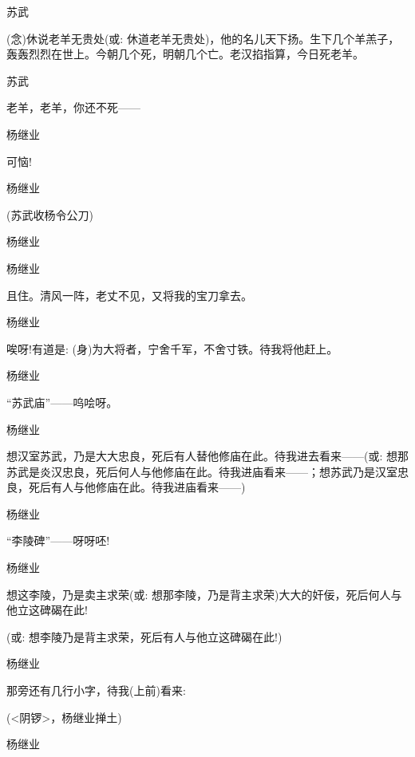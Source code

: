 {{苏武

({\akai 念})休说老羊无贵处({\akai 或}: 休道老羊无贵处)，他的名儿天下扬。生下几个羊羔子，轰轰烈烈在世上。今朝几个死，明朝几个亡。老汉掐指算，今日死老羊。}

{苏武\hspace{30pt}~

老羊，老羊，你还不死------}

{杨继业\hspace{20pt}~

可恼!}

{杨继业

 }

{(苏武收杨令公刀)}

{杨继业\hspace{20pt}~

 }

{杨继业\hspace{20pt}~

且住。清风一阵，老丈不见，又将我的宝刀拿去。}

{杨继业

唉呀!有道是: (身)为大将者，宁舍千军，不舍寸铁。待我将他赶上。}

{杨继业\hspace{20pt}~

``苏武庙''------呜哙呀。}

{杨继业

想汉室苏武，乃是大大忠良，死后有人替他修庙在此。待我进去看来------({\akai 或}: 想那苏武是炎汉忠良，死后何人与他修庙在此。待我进庙看来------；想苏武乃是汉室忠良，死后有人与他修庙在此。待我进庙看来------)}

{杨继业\hspace{20pt}~

``李陵碑''------呀呀呸!}

{杨继业

想这李陵，乃是卖主求荣({\akai 或}: 想那李陵，乃是背主求荣)大大的奸佞，死后何人与他立这碑碣在此!

({\akai 或}: 想李陵乃是背主求荣，死后有人与他立这碑碣在此!)}

{杨继业\hspace{20pt}~

那旁还有几行小字，待我(上前)看来: }

{(\textless{}阴锣\textgreater{}，杨继业掸土)}

{杨继业

}}
